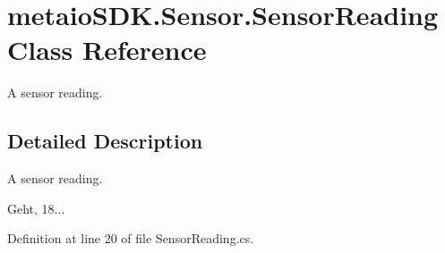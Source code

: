 \section{metaio\-S\-D\-K.\-Sensor.\-Sensor\-Reading Class Reference}
\label{classmetaio_s_d_k_1_1_sensor_1_1_sensor_reading}


A sensor reading.  




\subsection{Detailed Description}
A sensor reading. 

Geht, 18... 

Definition at line 20 of file Sensor\-Reading.\-cs.

